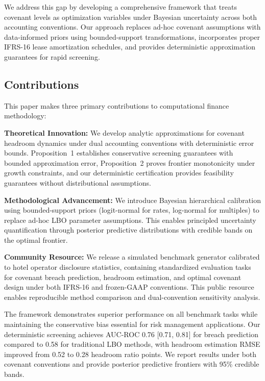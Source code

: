 \documentclass[11pt,a4paper]{article}
\begin{document}
We address this gap by developing a comprehensive framework that treats covenant levels as optimization variables under Bayesian uncertainty across both accounting conventions. Our approach replaces ad-hoc covenant assumptions with data-informed priors using bounded-support transformations, incorporates proper IFRS-16 lease amortization schedules, and provides deterministic approximation guarantees for rapid screening.

\subsection{Contributions}

This paper makes three primary contributions to computational finance methodology:

\textbf{Theoretical Innovation:} We develop analytic approximations for covenant headroom dynamics under dual accounting conventions with deterministic error bounds. Proposition~1 establishes conservative screening guarantees with bounded approximation error, Proposition~2 proves frontier monotonicity under growth constraints, and our deterministic certification provides feasibility guarantees without distributional assumptions.

\textbf{Methodological Advancement:} We introduce Bayesian hierarchical calibration using bounded-support priors (logit-normal for rates, log-normal for multiples) to replace ad-hoc LBO parameter assumptions. This enables principled uncertainty quantification through posterior predictive distributions with credible bands on the optimal frontier.

\textbf{Community Resource:} We release a simulated benchmark generator calibrated to hotel operator disclosure statistics, containing standardized evaluation tasks for covenant breach prediction, headroom estimation, and optimal covenant design under both IFRS-16 and frozen-GAAP conventions. This public resource enables reproducible method comparison and dual-convention sensitivity analysis.

The framework demonstrates superior performance on all benchmark tasks while maintaining the conservative bias essential for risk management applications. Our deterministic screening achieves AUC-ROC 0.76 [0.71, 0.81] for breach prediction compared to 0.58 for traditional LBO methods, with headroom estimation RMSE improved from 0.52 to 0.28 headroom ratio points. We report results under both covenant conventions and provide posterior predictive frontiers with 95\% credible bands.
\end{document}
